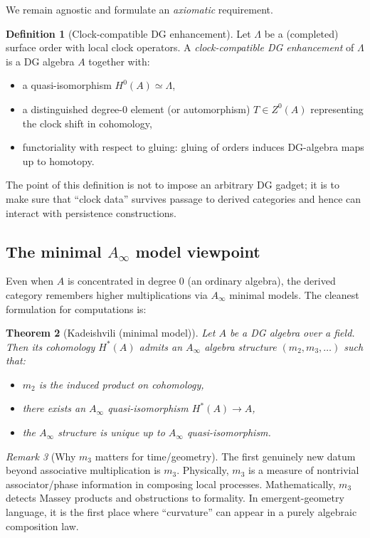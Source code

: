 \documentclass[11pt,oneside]{amsbook}
\numberwithin{equation}{section}
\theoremstyle{plain}
\newtheorem{theorem}{Theorem}[section]
\theoremstyle{definition}
\newtheorem{definition}[theorem]{Definition}
\theoremstyle{remark}
\newtheorem{remark}[theorem]{Remark}
\begin{document}
We remain agnostic and formulate an \emph{axiomatic} requirement.

\begin{definition}[Clock-compatible DG enhancement]
\label{def:clock_compatible_dg}
Let $\Lambda$ be a (completed) surface order with local clock operators.
A \emph{clock-compatible DG enhancement} of $\Lambda$ is a DG algebra $A$ together with:
\begin{itemize}
\item a quasi-isomorphism $H^0(A)\simeq \Lambda$,
\item a distinguished degree-$0$ element (or automorphism) $T\in Z^0(A)$ representing the clock shift in cohomology,
\item functoriality with respect to gluing: gluing of orders induces DG-algebra maps up to homotopy.
\end{itemize}
\end{definition}

The point of this definition is not to impose an arbitrary DG gadget; it is to make sure that ``clock data'' survives passage to derived categories and hence can interact with persistence constructions.

\subsection{The minimal $A_\infty$ model viewpoint}
\label{sec:Ainfty}

Even when $A$ is concentrated in degree $0$ (an ordinary algebra), the derived category remembers higher multiplications via $A_\infty$ minimal models.
The cleanest formulation for computations is:

\begin{theorem}[Kadeishvili (minimal model)]
Let $A$ be a DG algebra over a field.
Then its cohomology $H^*(A)$ admits an $A_\infty$ algebra structure $(m_2,m_3,\dots)$ such that:
\begin{itemize}
\item $m_2$ is the induced product on cohomology,
\item there exists an $A_\infty$ quasi-isomorphism $H^*(A)\to A$,
\item the $A_\infty$ structure is unique up to $A_\infty$ quasi-isomorphism.
\end{itemize}
\end{theorem}

\begin{remark}[Why $m_3$ matters for time/geometry]
The first genuinely new datum beyond associative multiplication is $m_3$.
Physically, $m_3$ is a measure of nontrivial associator/phase information in composing local processes.
Mathematically, $m_3$ detects Massey products and obstructions to formality.
In emergent-geometry language, it is the first place where ``curvature'' can appear in a purely algebraic composition law.
\end{remark}
\end{document}
